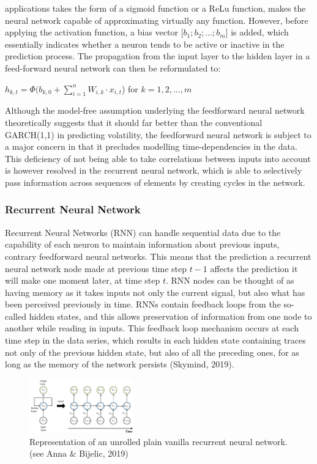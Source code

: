 \documentclass[a4paper,11pt,oneside]{book}
\begin{document}
applications takes the form of a sigmoid function or a ReLu function, makes the neural network capable of approximating virtually any function. However, before applying
the activation function, a bias vector [$b_{1};b_{2};...;b_{m}$] is added, which essentially
indicates whether a neuron tends to be active or inactive in the prediction process. The
propagation from the input layer to the hidden layer in a feed-forward neural
network can then be reformulated to:
 \begin{center}
	$h_{k,t} =\Phi(b_{k,0} +\sum_{i=1}^{n} W_{i,k} \cdot x_{i,t}$) for $k = 1,2,...,m$
\end{center}
Although the model-free assumption underlying the feedforward neural network
theoretically suggests that it should far better than the conventional GARCH(1,1) in
predicting volatility, the feedforward neural network is subject to a
major concern in that it precludes modelling time-dependencies in the data. This
deficiency of not being able to take correlations between inputs into account is
however resolved in the recurrent neural network, which is able to selectively pass
information across sequences of elements by creating cycles in the network.
\subsubsection{Recurrent Neural Network}
Recurrent Neural Networks
(RNN) can handle sequential data due to the capability of each neuron to
maintain information about previous inputs, contrary feedforward neural networks. This means that the prediction a recurrent
neural network node made at previous time step $t-1$ affects the prediction it will make one
moment later, at time step $t$. RNN nodes can be thought of as having memory as it takes inputs not only the current signal, but also
what has been perceived previously in time.\newline\newline
RNNs contain feedback loops from the so-called hidden states, and this allows preservation of information from one node to another while reading in inputs. This feedback loop
mechanism occurs at each time step in the data series, which results in each hidden
state containing traces not only of the previous hidden state, but also of all the
preceding ones, for as long as the memory of the network persists (Skymind, 2019).

\begin{figure}
	\centering
	\includegraphics[width=0.4\textwidth]{figures/RNN}
	\caption{Representation of an unrolled plain vanilla recurrent neural network. (see Anna \& Bijelic, 2019)}
	
	\label{seventhfig}
\end{figure}
\end{document}
